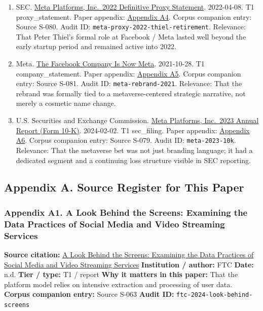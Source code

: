 \documentclass[
  american,
  11pt,
  letterpaper,
]{article}
\begin{document}
\begin{enumerate}
  the role dated back to 2005.
\item
  SEC.
  \href{https://www.sec.gov/Archives/edgar/data/1326801/000132680122000043/meta2022definitiveproxysta.htm}{Meta
  Platforms, Inc.~2022 Definitive Proxy Statement}. 2022-04-08. T1
  proxy\_statement. Paper appendix:
  \hyperref[appendix-a4-meta-platforms-inc-2022-definitive-proxy-statement]{Appendix
  A4}. Corpus companion entry: Source S-080. Audit ID:
  \texttt{meta-proxy-2022-thiel-retirement}. Relevance: That Peter
  Thiel's formal role at Facebook / Meta lasted well beyond the early
  startup period and remained active into 2022.
\item
  Meta.
  \href{https://about.fb.com/news/2021/10/facebook-company-is-now-meta/}{The
  Facebook Company Is Now Meta}. 2021-10-28. T1 company\_statement.
  Paper appendix:
  \hyperref[appendix-a5-the-facebook-company-is-now-meta]{Appendix A5}.
  Corpus companion entry: Source S-081. Audit ID:
  \texttt{meta-rebrand-2021}. Relevance: That the rebrand was formally
  tied to a metaverse-centered strategic narrative, not merely a
  cosmetic name change.
\item
  U.S. Securities and Exchange Commission.
  \href{https://www.sec.gov/Archives/edgar/data/1326801/000132680124000012/meta-20231231.htm}{Meta
  Platforms, Inc.~2023 Annual Report (Form 10-K)}. 2024-02-02. T1
  sec\_filing. Paper appendix:
  \hyperref[appendix-a6-meta-platforms-inc-2023-annual-report-form-10-k]{Appendix
  A6}. Corpus companion entry: Source S-079. Audit ID:
  \texttt{meta-2023-10k}. Relevance: That the metaverse bet was not just
  branding language; it had a dedicated segment and a continuing loss
  structure visible in SEC reporting.
\end{enumerate}

\subsection{Appendix A. Source Register for This
Paper}\label{appendix-a.-source-register-for-this-paper}

\subsubsection{Appendix A1. A Look Behind the Screens: Examining the
Data Practices of Social Media and Video Streaming
Services}\label{appendix-a1-a-look-behind-the-screens-examining-the-data-practices-of-social-media-and-video-streaming-services}

\textbf{Source citation:}
\href{https://www.ftc.gov/reports/look-behind-screens-examining-data-practices-social-media-video-streaming-services}{A
Look Behind the Screens: Examining the Data Practices of Social Media
and Video Streaming Services} \textbf{Institution / author:} FTC
\textbf{Date:} n.d. \textbf{Tier / type:} T1 / report \textbf{Why it
matters in this paper:} That the platform model relies on intensive
extraction and processing of user data. \textbf{Corpus companion entry:}
Source S-063 \textbf{Audit ID:} \texttt{ftc-2024-look-behind-screens}
\end{document}
